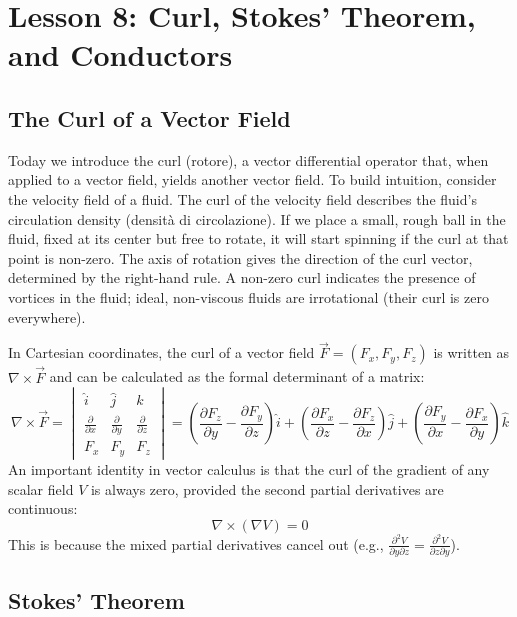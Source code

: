 \section*{Lesson 8: Curl, Stokes' Theorem, and Conductors}

\subsection*{The Curl of a Vector Field}

Today we introduce the curl (rotore), a vector differential operator that, when applied to a vector field, yields another vector field. To build intuition, consider the velocity field of a fluid. The curl of the velocity field describes the fluid's circulation density (densità di circolazione). If we place a small, rough ball in the fluid, fixed at its center but free to rotate, it will start spinning if the curl at that point is non-zero. The axis of rotation gives the direction of the curl vector, determined by the right-hand rule. A non-zero curl indicates the presence of vortices in the fluid; ideal, non-viscous fluids are irrotational (their curl is zero everywhere).

In Cartesian coordinates, the curl of a vector field \(\vec{F} = (F_x, F_y, F_z)\) is written as \(\nabla \times \vec{F}\) and can be calculated as the formal determinant of a matrix:
\[ \nabla \times \vec{F} = \begin{vmatrix} \hat{i} & \hat{j} & \hat{k} \\ \frac{\partial}{\partial x} & \frac{\partial}{\partial y} & \frac{\partial}{\partial z} \\ F_x & F_y & F_z \end{vmatrix} = \left(\frac{\partial F_z}{\partial y} - \frac{\partial F_y}{\partial z}\right)\hat{i} + \left(\frac{\partial F_x}{\partial z} - \frac{\partial F_z}{\partial x}\right)\hat{j} + \left(\frac{\partial F_y}{\partial x} - \frac{\partial F_x}{\partial y}\right)\hat{k} \]
An important identity in vector calculus is that the curl of the gradient of any scalar field \(V\) is always zero, provided the second partial derivatives are continuous:
\[ \nabla \times (\nabla V) = 0 \]
This is because the mixed partial derivatives cancel out (e.g., \(\frac{\partial^2 V}{\partial y \partial z} = \frac{\partial^2 V}{\partial z \partial y}\)).

\subsection*{Stokes' Theorem}

